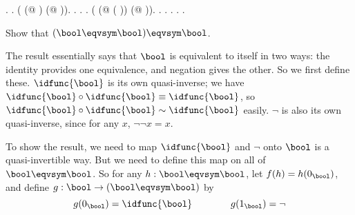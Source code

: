 \begin{coqdoccode}
\coqdocindent{1.00em}
.\coqdoceol
\coqdocindent{1.00em}
 .\coqdoceol
\coqdocindent{1.00em}
 ( (@  \coqdocvar{\_} \coqdocvar{\_} ) (@  \coqdocvar{\_} \coqdocvar{\_} )).\coqdoceol
\coqdocindent{1.00em}
 .  .\coqdoceol
\coqdocindent{1.00em}
 .\coqdoceol
\coqdocindent{1.00em}
 ( (@  \coqdocvar{\_} \coqdocvar{\_} (  )) (@  \coqdocvar{\_} \coqdocvar{\_} )).\coqdoceol
\coqdocindent{1.00em}
 .  .  .\coqdoceol
\coqdocnoindent
{}.\coqdoceol
\coqdocemptyline
\coqdocnoindent
{} .\coqdoceol
\coqdocemptyline
\end{coqdoccode}
Show that $(\bool \eqvsym \bool) \eqvsym \bool$.


 \soln
The result essentially says that $\bool$ is equivalent to itself in two ways:
the identity provides one equivalence, and negation gives the other.  So we
first define these.  $\idfunc{\bool}$ is its own quasi-inverse; we have
$\idfunc{\bool} \circ \idfunc{\bool} \equiv \idfunc{\bool}$, so $\idfunc{\bool}
\circ \idfunc{\bool}
\sim \idfunc{\bool}$ easily.  $\lnot$ is also its own quasi-inverse, since for
any $x$, $\lnot\lnot x = x$.


To show the result, we need to map $\idfunc{\bool}$ and $\lnot$ onto $\bool$ is
a quasi-invertible way.  But we need to define this map on all of $\bool
\eqvsym \bool$.  So for any $h : \bool\eqvsym\bool$, let $f(h) = h(0_{\bool})$,
and define $g : \bool \to (\bool \eqvsym \bool)$ by
\[
  g(0_{\bool}) = \idfunc{\bool} 
  \qquad\qquad
  g(1_{\bool}) = \lnot
\]


